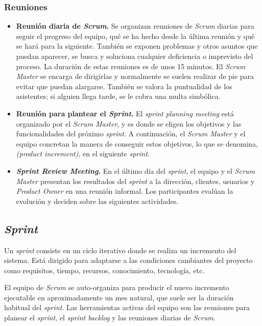 \subsubsection{Reuniones}
\begin{itemize}
\item \textbf{Reunión diaria de \textit{Scrum}.} Se organizan reuniones de \textit{Scrum} diarias para seguir el progreso del equipo, qué se ha hecho desde la última reunión y qué se hará para la siguiente. También se exponen problemas y otros asuntos que puedan aparecer, se busca y soluciona cualquier deficiencia o imprevisto del proceso.  La duración de estas reuniones es de unos 15 minutos. El \textit{Scrum Master} se encarga de dirigirlas y normalmente se suelen realizar de pie para evitar que puedan alargarse. También se valora la puntualidad de los asistentes; si alguien llega tarde, se le cobra una multa simbólica. 

\item \textbf{Reunión para plantear el \textit{Sprint}.} El \textit{sprint planning meeting} está organizado por el \textit{Scrum Master}, y es donde se eligen los objetivos y las funcionalidades del próximo \textit{sprint}. A continuación, el \textit{Scrum Master} y el equipo concretan la manera de conseguir estos objetivos, lo que se denomina, \textit{(product increment)}, en el siguiente \textit{sprint}.

\item \textbf{\textit{Sprint Review Meeting}.} En el último día del \textit{sprint}, el equipo y el \textit{Scrum Master} presentan los resultados del \textit{sprint} a la dirección, clientes, usuarios y \textit{Product Owner} en una reunión informal. Los participantes evalúan la evolución y deciden sobre las siguientes actividades. 
\end{itemize}

\subsection{\textit{Sprint}}
Un \textit{sprint} consiste en un ciclo iterativo donde se realiza un incremento del sistema. Está dirigido para adaptarse a las condiciones cambiantes del proyecto como requisitos, tiempo, recursos, conocimiento, tecnología, etc. 

El equipo de \textit{Scrum} se auto-organiza para producir el nuevo incremento ejecutable en aproximadamente un mes natural, que suele ser la duración habitual del \textit{sprint}. Las herramientas activas del equipo son las reuniones para planear el \textit{sprint}, el \textit{sprint backlog} y las reuniones diarias de \textit{Scrum}.

